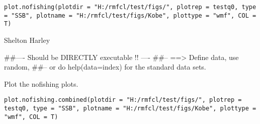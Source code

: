 \documentclass[a4paper]{book}
\begin{document}
%
\begin{Usage}
\begin{verbatim}
plot.nofishing(plotdir = "H:/rmfcl/test/figs/", plotrep = testq0, type = "SSB", plotname = "H:/rmfcl/test/figs/Kobe", plottype = "wmf", COL = T)
\end{verbatim}
\end{Usage}
%
\begin{Arguments}
\begin{ldescription}
\item[\code{plotdir}] 


\item[\code{plotrep}] 


\item[\code{type}] 


\item[\code{plotname}] 


\item[\code{plottype}] 


\item[\code{COL}] 


\end{ldescription}
\end{Arguments}
%
\begin{Author}\relax

Shelton Harley
\end{Author}
%
\begin{Examples}
\begin{ExampleCode}
##---- Should be DIRECTLY executable !! ----
##-- ==>  Define data, use random,
##--	or do  help(data=index)  for the standard data sets.

\end{ExampleCode}
\end{Examples}
%
\begin{Description}\relax

Plot the nofishing plots. 
\end{Description}
%
\begin{Usage}
\begin{verbatim}
plot.nofishing.combined(plotdir = "H:/rmfcl/test/figs/", plotrep = testq0, type = "SSB", plotname = "H:/rmfcl/test/figs/Kobe", plottype = "wmf", COL = T)
\end{verbatim}
\end{Usage}
\end{document}

